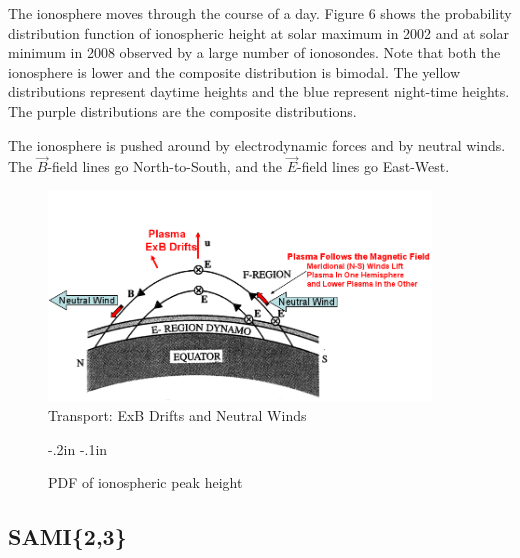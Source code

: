 \documentclass[12pt]{IEEEtran}
\begin{document}
    The ionosphere moves through the course of a day. Figure 6 shows the probability distribution function of ionospheric height at solar maximum in 2002 and at solar minimum in 2008 observed by a large number of ionosondes. Note that both the ionosphere is lower and the composite distribution is bimodal. The yellow distributions represent daytime heights and the blue represent night-time heights. The purple distributions are the composite distributions.

The ionosphere is pushed around by electrodynamic forces and by neutral winds. The $\vec B$-field lines go North-to-South, and the $\vec E$-field lines go East-West.
\begin{figure}[htbp]
  \includegraphics[width=4in]{plasma}
  \caption{Transport: ExB Drifts and Neutral Winds}
\end{figure}
    \begin{figure}[htbp]
     \kern-.2in
     \kern-.1in
      \caption{PDF of ionospheric peak height}
      \label{plot}
    \end{figure}
\subsection{SAMI\{2,3\}}
  
\end{document}
